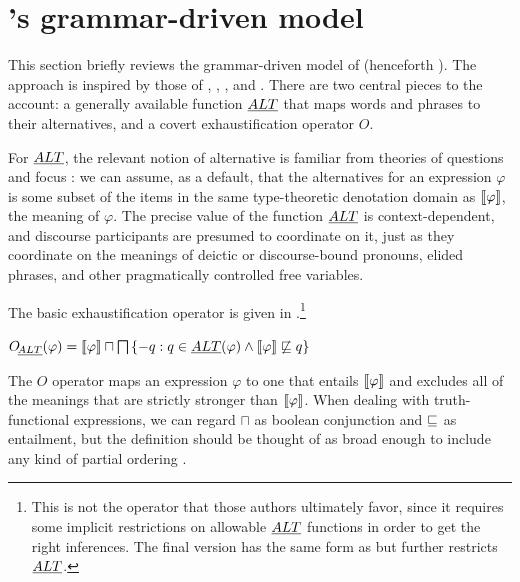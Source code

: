 \documentclass[leqno,12pt]{article}
\begin{document}



\section{\CFS's grammar-driven model}\label{sec:cfs}

This section briefly reviews the grammar-driven model of
\citet{ChierchiaFoxSpector08} (henceforth \CFS).  The approach is
inspired by those of \citet{Chierchia01}, \citet{Sauerland01},
\citet{Spector:2007}, and \citet{Fox:2007,Fox:2009}. There are two
central pieces to the account: a generally available function $\emph{ALT}$
that maps words and phrases to their alternatives, and a covert
exhaustification operator $O$.

For $\emph{ALT}$, the relevant notion of alternative is familiar from
theories of questions and focus \citep{Groenendijk84,Rooth85,Rooth92}:
we can assume, as a default, that the alternatives for an expression
$\varphi$ is some subset of the items in the same type-theoretic
denotation domain as $\llbracket\varphi\rrbracket$, the meaning of $\varphi$. 
The precise value of the function $\emph{ALT}$ is context-dependent, and
discourse participants are presumed to coordinate on it, just as they
coordinate on the meanings of deictic or discourse-bound pronouns,
elided phrases, and other pragmatically controlled free variables.

The basic exhaustification operator is given in 
\citep{Spector:2007,Fox:2007,Fox:2009,Magri:2009,ChierchiaFoxSpector08}.\footnote{This
  is not the operator that those authors ultimately favor, since it
  requires some implicit restrictions on allowable $\emph{ALT}$ functions in
  order to get the right inferences.  The final version has the same
  form as  but further restricts $\emph{ALT}$.}
%
\begin{examples}
\item\label{def:O}
  $\mathop{O\negthinspace_{\emph{ALT}}}(\varphi) = 
  \llbracket\varphi\rrbracket \sqcap \bigsqcap\left\{  -q : q \in \emph{ALT}(\varphi) \wedge \llbracket\varphi\rrbracket \not\sqsubseteq q \right\}$ 
\end{examples}
%
The $O$ operator maps an expression $\varphi$ to one that entails
$\llbracket\varphi\rrbracket$ and excludes all of the meanings that are strictly
stronger than $\llbracket\varphi\rrbracket$. When dealing with truth-functional
expressions, we can regard $\sqcap$ as boolean conjunction and
$\sqsubseteq$ as entailment, but the definition should be thought of as
broad enough to include any kind of partial ordering
.
\end{document}
